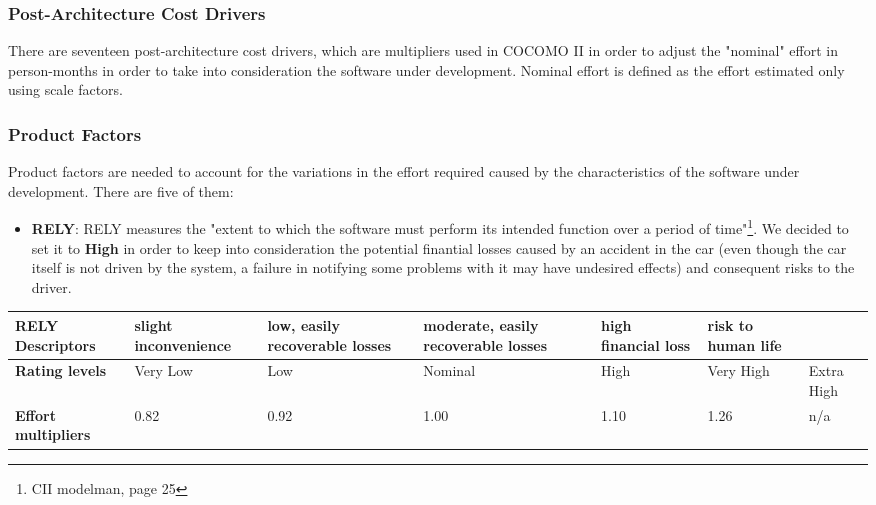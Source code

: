\subsubsection{Post-Architecture Cost Drivers}
There are seventeen post-architecture cost drivers, which are multipliers used in COCOMO II in order to adjust the "nominal" effort in person-months in order to take into consideration the software under development. Nominal effort is defined as the effort estimated only using scale factors. 

	\subsubsection*{Product Factors}
	Product factors are needed to account for the variations in the effort required caused by the characteristics of the software under development. There are five of them:
	
	
	
		\begin{itemize}
			\item \textbf{RELY}: RELY measures the "extent to which the software must perform its intended
function over a period of time"\footnote{CII modelman, page 25}. We decided to set it to \textbf{High} in order to keep into consideration the potential finantial losses caused by an accident in the car (even though the car itself is not driven by the system, a failure in notifying some problems with it may have undesired effects) and consequent risks to the driver. 
		\end{itemize}
		
		\begin{center}
			\begin{tabular}{ | C{2cm} | C{2cm} | C{2cm} | C{2cm} | C{2cm} | C{2cm} | C{2cm} | }
				\hline
				\textbf{RELY Descriptors} & slight inconvenience & low, easily recoverable losses & moderate, easily recoverable losses & high financial loss & risk to human life & \\ \hline
			
				\textbf{Rating levels} & Very Low & Low & Nominal & High & Very High & Extra High\\ \hline
			
				\textbf{Effort multipliers} & 0.82 & 0.92 & 1.00 & 1.10 & 1.26 & n/a\\ \hline
			\end{tabular}
		\end{center}
		
		
		
